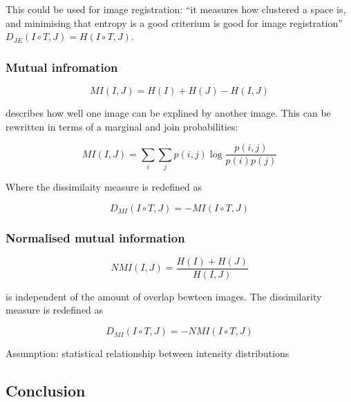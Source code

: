\documentclass[11pt]{article}
\begin{document}
This could be used for image registration: ``it measures how clustered a space is, and minimising that entropy is a good criterium is good for image registration'' $D_{JE}(I\circ T, J) = H(I \circ T, J)$.

\subsubsection{Mutual infromation}

\begin{equation}
    MI(I,J) = H(I) + H(J) - H(I,J)
\end{equation}

describes how well one image can be explined by another image. This can be rewritten in terms of a marginal and join probabilities:

\begin{equation}
    MI(I,J) = \sum_i \sum_j p(i,j)\log \frac{p(i,j)}{p(i)p(j)}
\end{equation}

Where the dissimilaity measure is redefined as

\begin{equation}
    D_{MI}(I\circ T,J)=-MI(I \circ T, J)
\end{equation}

\subsubsection{Normalised mutual information}

\begin{equation}
    NMI(I,J) = \frac{H(I) + H(J)}{H(I,J)}
\end{equation}

is independent of the amount of overlap bewteen images. The dissimilarity measure is redefined as 

\begin{equation}
    D_{MI}(I\circ T,J)=-NMI(I \circ T, J)
\end{equation}

Assumption: statistical relationship between intensity distributions

\subsection{Conclusion}

\begin{figure}[H]
    \centering
\end{figure}
\end{document}

